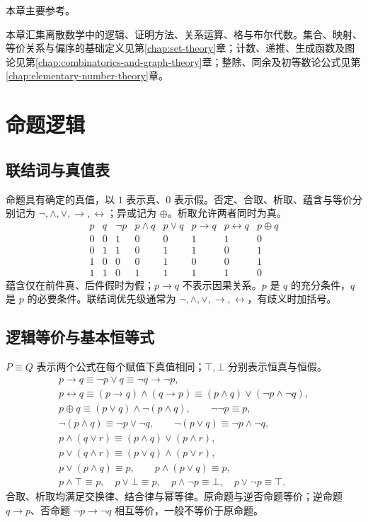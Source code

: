 \documentclass[../main.tex]{subfiles}
\begin{document}
本章主要参考\cite{mcs}。

本章汇集离散数学中的逻辑、证明方法、关系运算、格与布尔代数。集合、映射、等价关系与偏序的基础定义见第\ref{chap:set-theory}章；计数、递推、生成函数及图论见第\ref{chap:combinatorics-and-graph-theory}章；整除、同余及初等数论公式见第\ref{chap:elementary-number-theory}章。

\section{命题逻辑}
\subsection{联结词与真值表}
命题具有确定的真值，以 $1$ 表示真、$0$ 表示假。否定、合取、析取、蕴含与等价分别记为 $\neg,\land,\lor,\to,\leftrightarrow$；异或记为 $\oplus$。析取允许两者同时为真。
\[
\begin{array}{cc|c|ccccc}
p&q&\neg p&p\land q&p\lor q&p\to q&p\leftrightarrow q&p\oplus q\\\hline
0&0&1&0&0&1&1&0\\
0&1&1&0&1&1&0&1\\
1&0&0&0&1&0&0&1\\
1&1&0&1&1&1&1&0
\end{array}
\]
蕴含仅在前件真、后件假时为假；$p\to q$ 不表示因果关系。$p$ 是 $q$ 的充分条件，$q$ 是 $p$ 的必要条件。联结词优先级通常为 $\neg,\land,\lor,\to,\leftrightarrow$，有歧义时加括号。

\subsection{逻辑等价与基本恒等式}
$P\equiv Q$ 表示两个公式在每个赋值下真值相同；$\top,\bot$ 分别表示恒真与恒假。
\begin{gather*}
p\to q\equiv\neg p\lor q\equiv\neg q\to\neg p,\\
p\leftrightarrow q\equiv(p\to q)\land(q\to p)
\equiv(p\land q)\lor(\neg p\land\neg q),\\
p\oplus q\equiv(p\lor q)\land\neg(p\land q),\qquad
\neg\neg p\equiv p,\\
\neg(p\land q)\equiv\neg p\lor\neg q,\qquad
\neg(p\lor q)\equiv\neg p\land\neg q,\\
p\land(q\lor r)\equiv(p\land q)\lor(p\land r),\\
p\lor(q\land r)\equiv(p\lor q)\land(p\lor r),\\
p\lor(p\land q)\equiv p,\qquad p\land(p\lor q)\equiv p,\\
p\land\top\equiv p,\quad p\lor\bot\equiv p,\quad
p\land\neg p\equiv\bot,\quad p\lor\neg p\equiv\top.
\end{gather*}
合取、析取均满足交换律、结合律与幂等律。原命题与逆否命题等价；逆命题 $q\to p$、否命题 $\neg p\to\neg q$ 相互等价，一般不等价于原命题。
\end{document}
